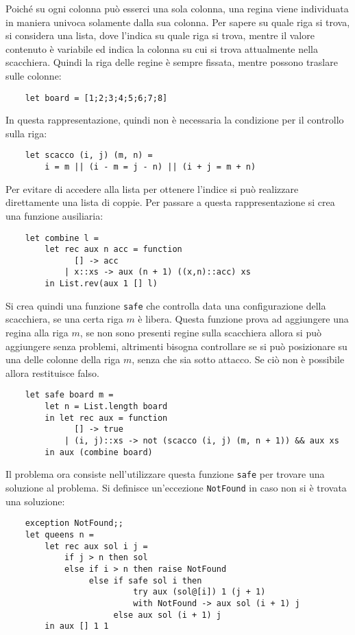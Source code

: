 \documentclass{article}
\numberwithin{equation}{subsection}
\begin{document}
Poiché su ogni colonna può esserci una sola colonna, una regina viene individuata in maniera univoca solamente dalla sua colonna. Per sapere su quale riga si trova, si considera una lista, dove l'indica su quale riga si trova, mentre il valore contenuto è variabile ed indica la colonna su cui si trova attualmente nella scacchiera. Quindi la riga delle regine è sempre fissata, mentre possono traslare sulle colonne:
\begin{verbatim}
    let board = [1;2;3;4;5;6;7;8]
\end{verbatim}
In questa rappresentazione, quindi non è necessaria la condizione per il controllo sulla riga:
\begin{verbatim}
    let scacco (i, j) (m, n) =
        i = m || (i - m = j - n) || (i + j = m + n)
\end{verbatim}
Per evitare di accedere alla lista per ottenere l'indice si può realizzare direttamente una lista di coppie. Per passare a questa rappresentazione si crea una funzione ausiliaria:
\begin{verbatim}
    let combine l = 
        let rec aux n acc = function
              [] -> acc
            | x::xs -> aux (n + 1) ((x,n)::acc) xs
        in List.rev(aux 1 [] l)
\end{verbatim}
Si crea quindi una funzione \verb|safe| che controlla data una configurazione della scacchiera, se una certa riga $m$ è libera. %
Questa funzione prova ad aggiungere una regina alla riga $m$, se non sono presenti regine sulla scacchiera allora si può aggiungere senza problemi, altrimenti bisogna controllare se si può posizionare su una delle colonne della riga $m$, senza che sia sotto attacco. Se ciò non è possibile allora restituisce falso. 
\begin{verbatim}
    let safe board m =
        let n = List.length board
        in let rec aux = function
              [] -> true
            | (i, j)::xs -> not (scacco (i, j) (m, n + 1)) && aux xs
        in aux (combine board)    
\end{verbatim}

Il problema ora consiste nell'utilizzare questa funzione \verb|safe| per trovare una soluzione al problema. Si definisce un'eccezione \verb|NotFound| in caso non si è trovata una soluzione: 
\begin{verbatim}
    exception NotFound;;
    let queens n = 
        let rec aux sol i j = 
            if j > n then sol
            else if i > n then raise NotFound
                 else if safe sol i then 
                          try aux (sol@[i]) 1 (j + 1)
                          with NotFound -> aux sol (i + 1) j
                      else aux sol (i + 1) j
        in aux [] 1 1
\end{verbatim}
\end{document}
